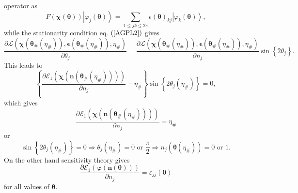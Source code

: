 \documentclass[aps,preprint]{revtex4}%
\begin{document}
operator as
\begin{equation}
F\left(  \mathbf{\chi\left(  \mathbf{\theta}\right)  }\right)  \left\vert
\varphi_{j}\mathbf{\left(  \mathbf{\theta}\right)  }\right\rangle =\sum_{1\leq
jk\leq2s}\epsilon\mathbf{\left(  \mathbf{\theta}\right)  }_{kj}\left\vert
\varphi_{k}\mathbf{\left(  \mathbf{\theta}\right)  }\right\rangle ,
\end{equation}
while the stationarity condition eq. $\left(  \ref{AGPL2}\right)  $ gives
\begin{equation}
\frac{\partial\mathcal{L}\left(  \mathbf{\chi}\left(  \mathbf{\theta}%
_{\#}\left(  \eta_{\#}\right)  \right)  ,\mathbf{\epsilon}\left(
\mathbf{\theta}_{\#}\left(  \eta_{\#}\right)  \right)  \mathbf{,}\eta
_{\#}\right)  }{\partial\theta_{j}}=\frac{\partial\mathcal{L}\left(
\mathbf{\chi}\left(  \mathbf{\theta}_{\#}\left(  \eta_{\#}\right)  \right)
,\mathbf{\epsilon}\left(  \mathbf{\theta}_{\#}\left(  \eta_{\#}\right)
\right)  \mathbf{,}\eta_{\#}\right)  }{\partial n_{j}}\sin\left\{  2\theta
_{j}\right\}  .
\end{equation}
This leads to
\begin{equation}
\left\{  \frac{\partial\mathcal{E}_{1}\left(  \mathbf{\chi}\left(
\mathbf{n}\left(  \mathbf{\theta}_{\#}\left(  \eta_{\#}\right)  \right)
\right)  \right)  }{\partial n_{j}}-\eta_{\#}\right\}  \sin\left\{
2\theta_{j}\left(  \eta_{\#}\right)  \right\}  =0,
\end{equation}
which gives
\begin{equation}
\frac{\partial\mathcal{E}_{1}\left(  \mathbf{\chi}\left(  \mathbf{n}\left(
\mathbf{\theta}_{\#}\left(  \eta_{\#}\right)  \right)  \right)  \right)
}{\partial n_{j}}=\eta_{\#}%
\end{equation}
or
\begin{equation}
\sin\left\{  2\theta_{j}\left(  \eta_{\#}\right)  \right\}  =0\Rightarrow
\theta_{j}\left(  \eta_{\#}\right)  =0\text{ or }\frac{\pi}{2}\Rightarrow
n_{j}\left(  \mathbf{\theta}\left(  \eta_{\#}\right)  \right)  =0\text{ or }1.
\end{equation}
On the other hand sensitivity theory gives%
\begin{equation}
\frac{\partial\mathcal{E}_{1}\left(  \mathbf{\varphi}\left(  \mathbf{n}\left(
\mathbf{\theta}\right)  \right)  \right)  }{\partial n_{j}}=\varepsilon
_{jj}\mathbf{\left(  \mathbf{\theta}\right)  }%
\end{equation}
for all values of $\mathbf{\theta.}$
\end{document}
